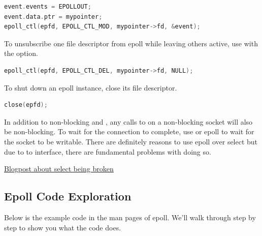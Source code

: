 \begin{lstlisting}[language=C]
event.events = EPOLLOUT;
event.data.ptr = mypointer;
epoll_ctl(epfd, EPOLL_CTL_MOD, mypointer->fd, &event);
\end{lstlisting}

To unsubscribe one file descriptor from epoll while leaving others active, use  with the  option.

\begin{lstlisting}[language=C]
epoll_ctl(epfd, EPOLL_CTL_DEL, mypointer->fd, NULL);
\end{lstlisting}

To shut down an epoll instance, close its file descriptor.

\begin{lstlisting}[language=C]
close(epfd);
\end{lstlisting}

In addition to non-blocking  and , any calls to  on a non-blocking socket will also be non-blocking.
To wait for the connection to complete, use  or epoll to wait for the socket to be writable.
There are definitely reasons to use epoll over select but due to to interface, there are fundamental problems with doing so.

\href{https://idea.popcount.org/2017-01-06-select-is-fundamentally-broken/}{Blogpost about select being broken}

\subsection{Epoll Code Exploration}

Below is the example code in the man pages of epoll.
We'll walk through step by step to show you what the code does.

